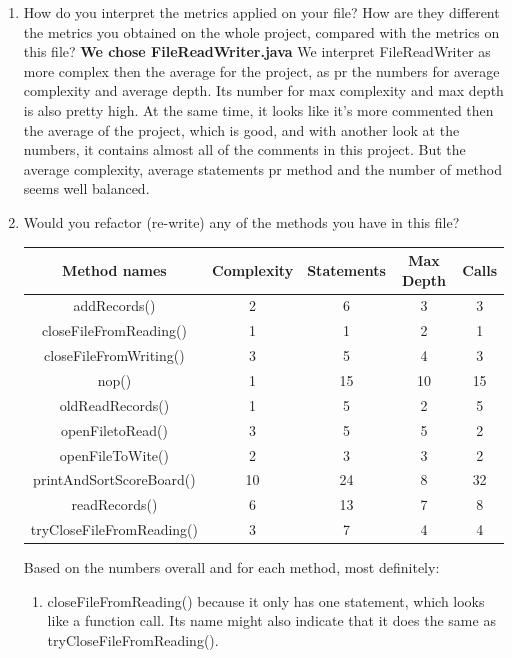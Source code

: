 \documentclass{article}
\begin{document}
\begin{enumerate}
\item
How do you interpret the metrics applied on your file? How are they different the metrics you
obtained on the whole project, compared with the metrics on this file?\newline
\textbf{We chose FileReadWriter.java}\newline
We interpret FileReadWriter as more complex then the average for the project, as pr the 
numbers for average complexity and average depth. Its number for max complexity and
max depth is also pretty high. At the same time, it looks like it's more commented then
the average of the project, which is good, and with another look at the numbers, it contains 
almost all of the comments in this project. But the average complexity, average statements
pr method and the number of method seems well balanced.



\item
Would	you	refactor	(re-write)	any	of	the	methods you	have	in	this	file?	

\begin{tabulary}{0.5\textwidth}{| c | c | c | c | c |}
 \hline
\textbf{Method names} &	\textbf{Complexity} & \textbf{Statements} & \textbf{Max Depth} & \textbf{Calls} \\ \hline

addRecords()				& 2 & 6 & 3 & 3 \\ \hline
closeFileFromReading() 		& 1 & 1 & 2 & 1 \\ \hline
closeFileFromWriting() 		& 3 & 5 & 4 & 3 \\ \hline
nop() 				  		& 1 & 15 & 10 & 15 \\ \hline
oldReadRecords()		  	& 1 & 5 & 2 & 5 \\ \hline
openFiletoRead()			& 3 & 5 & 5 & 2 \\ \hline
openFileToWite()			& 2 & 3 & 3 & 2 \\ \hline
printAndSortScoreBoard()	& 10 & 24 & 8 & 32 \\ \hline
readRecords()				& 6 & 13 & 7 & 8 \\ \hline
tryCloseFileFromReading()	& 3 & 7 & 4 & 4 \\ \hline
\end{tabulary}

Based on the numbers overall and for each method, most definitely:
\begin{enumerate}
\item
closeFileFromReading() because it only has one statement, which looks like a function call.
Its name might also indicate that it does the same as tryCloseFileFromReading().


\end{enumerate}
\end{enumerate}
\end{document}
